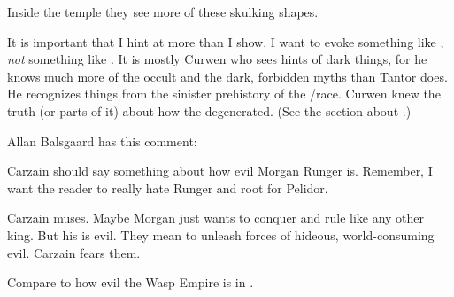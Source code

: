 \begin{changes}
    Inside the temple they see more of these skulking shapes.
    
    It is important that I hint at more than I show. 
    I want to evoke something like \cite{HPLovecraft:AttheMountainsofMadness}, \emph{not} something like \cite{JohnGlasby:TheBroodingCity}. 
    It is mostly Curwen who sees hints of dark things, for he knows much more of the occult and the dark, forbidden myths than Tantor does.
    He recognizes things from the sinister prehistory of the \scatha/\meccaran race.
    Curwen knew the truth (or parts of it) about how the \meccara degenerated. 
    (See the section about .)
    
    Allan Balsgaard has this comment:
  
  
  \begin{comment}
    \paragraph{The Terror of \EreshKal}
  \end{comment}
    Carzain should say something about how evil Morgan Runger is.
    Remember, I want the reader to really hate Runger and root for Pelidor. 
    
    Carzain muses.
    Maybe Morgan just wants to conquer and rule like any other king.
    But his \ishrah is evil. 
    They mean to unleash forces of hideous, world-consuming evil. 
    Carzain fears them. 
    
    Compare to how evil the Wasp Empire is in \cite{AdrianTchaikovsky:ShadowsoftheApt}. 
    
    
  \begin{comment}
    \paragraph{The Gods of \EreshKal}
  \end{comment}
    

\end{changes}
